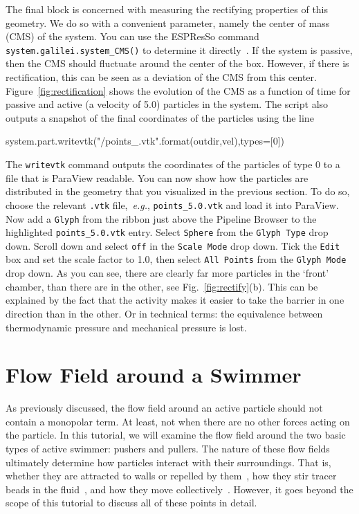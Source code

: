 \documentclass[aip,jcp,reprint,a4paper,onecolumn,amsmath]{revtex4-1}
\newcommand\code{\lstinline}
\newcommand{\es}{\mbox{\textsf{ESPResSo}}\xspace}
\newcommand\codees{\lstinline[language=python]}
\begin{document}
The final block is concerned with measuring the rectifying properties of this
geometry. We do so with a convenient parameter, namely the center of mass (CMS)
of the system. You can use the \es{} command
\codees{system.galilei.system_CMS()} to determine it directly~\cite{UG}. If the
system is passive, then the CMS should fluctuate around the center of the box.
However, if there is rectification, this can be seen as a deviation of the CMS
from this center. Figure~\ref{fig:rectification} shows the evolution of the CMS
as a function of time for passive and active (a velocity of 5.0) particles in
the system. The script also outputs a snapshot of the final coordinates of the
particles using the line
\begin{espresso}
system.part.writevtk("{}/points_{}.vtk".format(outdir,vel),types=[0])
\end{espresso}
The \codees{writevtk} command outputs the coordinates of the particles of type
0 to a file that is ParaView readable. You can now show how the particles are
distributed in the geometry that you visualized in the previous section. To do
so, choose the relevant \code{.vtk} file,~\textit{e.g.}, \code{points_5.0.vtk}
and load it into ParaView. Now add a \code{Glyph} from the ribbon just above
the Pipeline Browser to the highlighted \code{points_5.0.vtk} entry. Select
\code{Sphere} from the \code{Glyph Type} drop down. Scroll down and select
\code{off} in the \code{Scale Mode} drop down. Tick the \code{Edit} box and set
the scale factor to 1.0, then select \code{All Points} from the \code{Glyph
Mode} drop down. As you can see, there are clearly far more particles in the
`front' chamber, than there are in the other, see Fig.~\ref{fig:rectify}(b).
This can be explained by the fact that the activity makes it easier to take the
barrier in one direction than in the other. Or in technical terms: the
equivalence between thermodynamic pressure and mechanical pressure is lost.

\section{\label{sec:flow}Flow Field around a Swimmer}

As previously discussed, the flow field around an active particle should not
contain a monopolar term. At least, not when there are no other forces acting
on the particle. In this tutorial, we will examine the flow field around the
two basic types of active swimmer: pushers and pullers. The nature of these
flow fields ultimately determine how particles interact with their
surroundings. That is, whether they are attracted to walls or repelled by
them~\cite{Spagnolie_12}, how they stir tracer beads in the
fluid~\cite{Morozov_14}, and how they move collectively~\cite{Zoettl_14}.
However, it goes beyond the scope of this tutorial to discuss all of these
points in detail.
\end{document}
